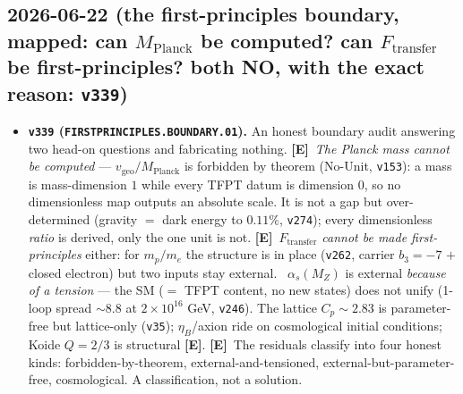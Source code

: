 \documentclass[11pt]{article}
\providecommand{\mE}{\textbf{[E]}}\providecommand{\mC}{\textbf{[C]}}
\providecommand{\vref}[1]{\texttt{#1}}
\begin{document}
\subsection*{2026-06-22 (the first-principles boundary, mapped: can $M_{\mathrm{Planck}}$ be computed? can $F_{\mathrm{transfer}}$ be first-principles? both NO, with the exact reason: \texttt{v339})}
\begin{itemize}
\item \textbf{\texttt{v339} (\texttt{FIRSTPRINCIPLES.BOUNDARY.01}).} An honest boundary audit answering two
head-on questions and fabricating nothing. \mE\ \emph{The Planck mass cannot be computed} ---
$v_{\mathrm{geo}}/M_{\mathrm{Planck}}$ is forbidden by theorem (No-Unit, \vref{v153}): a mass is mass-dimension
$1$ while every TFPT datum is dimension $0$, so no dimensionless map outputs an absolute scale. It is not a gap but
over-determined (gravity $=$ dark energy to $0.11\%$, \vref{v274}); every dimensionless \emph{ratio} is derived, only
the one unit is not. \mE\ \emph{$F_{\mathrm{transfer}}$ cannot be made first-principles} either: for $m_p/m_e$ the
structure is in place (\vref{v262}, carrier $b_3{=}{-}7$ $+$ closed electron) but two inputs stay external. \mX\
$\alpha_s(M_Z)$ is external \emph{because of a tension} --- the SM ($=$ TFPT content, no new states) does not unify
(1-loop spread ${\sim}8.8$ at $2{\times}10^{16}$ GeV, \vref{v246}). The lattice $C_p\!\sim\!2.83$ is parameter-free
but lattice-only (\vref{v35}); $\eta_B$/axion ride on cosmological initial conditions; Koide $Q{=}2/3$ is structural
\mE. \mE\ The residuals classify into four honest kinds: forbidden-by-theorem, external-and-tensioned,
external-but-parameter-free, cosmological. A classification, not a solution.
\end{itemize}
\end{document}
